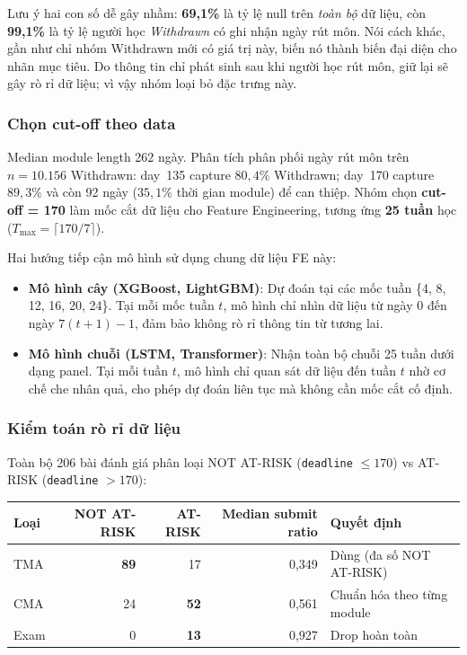 Lưu ý hai con số dễ gây nhầm: \textbf{69,1\%} là tỷ lệ null trên \textit{toàn bộ} dữ liệu, còn \textbf{99,1\%} là tỷ lệ người học \textit{Withdrawn} có ghi nhận ngày rút môn. Nói cách khác, gần như chỉ nhóm Withdrawn mới có giá trị này, biến nó thành biến đại diện cho nhãn mục tiêu. Do thông tin chỉ phát sinh sau khi người học rút môn, giữ lại sẽ gây rò rỉ dữ liệu; vì vậy nhóm loại bỏ đặc trưng này.

\subsubsection{Chọn cut-off theo data}

Median module length 262 ngày. Phân tích phân phối ngày rút môn trên
$n=10.156$ Withdrawn: day~135 capture $80{,}4\%$
Withdrawn; day~170 capture $89{,}3\%$ và còn 92 ngày ($35{,}1\%$ thời
gian module) để can thiệp. Nhóm chọn \textbf{cut-off = 170} làm mốc
cắt dữ liệu cho Feature Engineering, tương ứng \textbf{25 tuần} học
($T_{\max} = \lceil 170/7 \rceil$).

Hai hướng tiếp cận mô hình sử dụng chung dữ liệu FE này:
\begin{itemize}[noitemsep,topsep=0pt]
    \item \textbf{Mô hình cây (XGBoost, LightGBM)}: Dự đoán
    tại các mốc tuần \{4, 8, 12, 16, 20, 24\}. Tại mỗi mốc tuần $t$,
    mô hình chỉ nhìn dữ liệu từ ngày $0$ đến ngày $7(t + 1) - 1$, đảm bảo
    không rò rỉ thông tin từ tương lai.
    \item \textbf{Mô hình chuỗi (LSTM, Transformer)}: Nhận toàn bộ
    chuỗi 25 tuần dưới dạng panel. Tại mỗi tuần $t$, mô hình chỉ
    quan sát dữ liệu đến tuần $t$ nhờ cơ chế che nhân quả,
    cho phép dự đoán liên tục mà không cần mốc cắt cố định.
\end{itemize}

\subsubsection{Kiểm toán rò rỉ dữ liệu}

Toàn bộ 206 bài đánh giá phân loại NOT AT-RISK (\texttt{deadline} $\le 170$)
vs AT-RISK (\texttt{deadline} $> 170$):

\begin{center}
\small
\renewcommand{\arraystretch}{1.3}
\begin{tabular}{|l|r|r|r|p{3.4cm}|}
\hline
\textbf{Loại} & \textbf{NOT AT-RISK} & \textbf{AT-RISK} & \textbf{Median submit ratio} & \textbf{Quyết định} \\
\hline
TMA  & \textbf{89} & 17 & 0,349 & Dùng (đa số NOT AT-RISK) \\
CMA  & 24 & \textbf{52} & 0,561 & Chuẩn hóa theo từng module \\
Exam & 0  & \textbf{13} & 0,927 & Drop hoàn toàn \\
\hline
\end{tabular}
\end{center}

